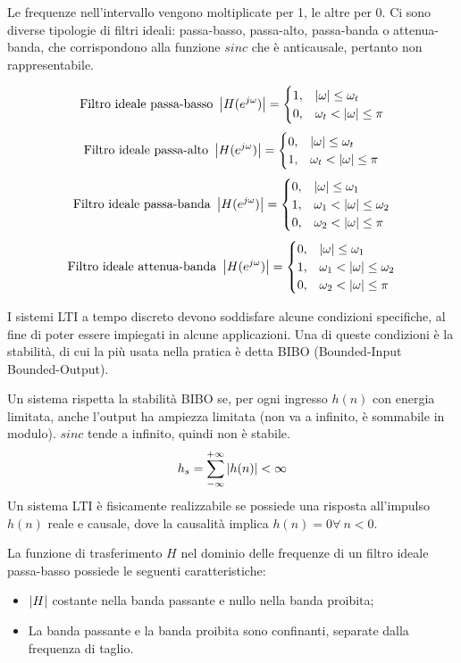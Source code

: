 Le frequenze nell'intervallo vengono moltiplicate per 1, le altre per 0. Ci sono diverse tipologie di filtri ideali: passa-basso, passa-alto, passa-banda o attenua-banda, che corrispondono alla funzione $sinc$ che è anticausale, pertanto non rappresentabile. 

$$\text{Filtro ideale passa-basso } \left|H(e^{j\omega})\right| = \begin{cases}
1, & \left|\omega\right| \leq \omega_t \\
0, & \omega_t < \left|\omega\right| \leq \pi
\end{cases}$$
$$\text{Filtro ideale passa-alto } \left|H(e^{j\omega})\right| = \begin{cases}
0, & \left|\omega\right| \leq \omega_t \\
1, & \omega_t < \left|\omega\right| \leq \pi
\end{cases}$$
$$\text{Filtro ideale passa-banda } \left|H(e^{j\omega})\right| = \begin{cases}
0, & \left|\omega\right| \leq \omega_1 \\
1, & \omega_1 < \left|\omega\right| \leq \omega_2 \\
0, & \omega_2 < \left|\omega\right| \leq \pi
\end{cases}$$
$$\text{Filtro ideale attenua-banda } \left|H(e^{j\omega})\right| = \begin{cases}
0, & \left|\omega\right| \leq \omega_1 \\
1, & \omega_1 < \left|\omega\right| \leq \omega_2 \\
0, & \omega_2 < \left|\omega\right| \leq \pi
\end{cases}$$

I sistemi LTI a tempo discreto devono soddisfare alcune condizioni specifiche, al fine di poter essere impiegati in alcune applicazioni. Una di queste condizioni è la stabilità, di cui la più usata nella pratica è detta BIBO (Bounded-Input Bounded-Output).

Un sistema rispetta la stabilità BIBO se, per ogni ingresso $h(n)$ con energia limitata, anche l'output ha ampiezza limitata (non va a infinito, è sommabile in modulo). $sinc$ tende a infinito, quindi non è stabile. 
$$h_s = \sum_{-\infty}^{+\infty} \left|h(n)\right| < \infty$$
Un sistema LTI è fisicamente realizzabile se possiede una risposta all'impulso $h(n)$ reale e causale, dove la causalità implica $h(n) = 0 \forall\ n < 0$.

La funzione di trasferimento $H$ nel dominio delle frequenze di un filtro ideale passa-basso possiede le seguenti caratteristiche:
\begin{itemize}
	\item $\left|H\right|$ costante nella banda passante e nullo nella banda proibita;
	\item La banda passante e la banda proibita sono confinanti, separate dalla frequenza di taglio.
\end{itemize}

